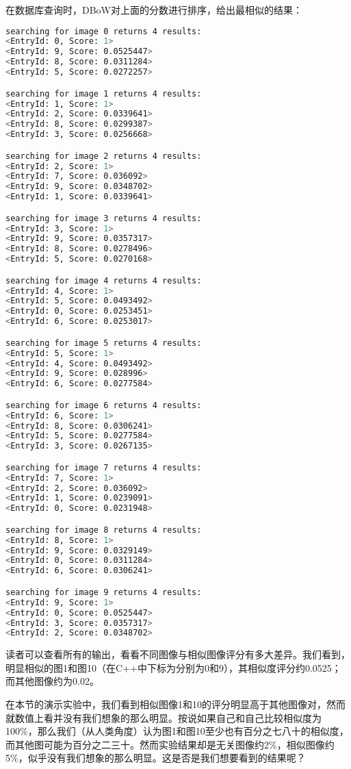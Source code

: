 在数据库查询时，DBoW对上面的分数进行排序，给出最相似的结果：
\begin{lstlisting}[language=sh,caption=终端输出：]
searching for image 0 returns 4 results:
<EntryId: 0, Score: 1>
<EntryId: 9, Score: 0.0525447>
<EntryId: 8, Score: 0.0311284>
<EntryId: 5, Score: 0.0272257>

searching for image 1 returns 4 results:
<EntryId: 1, Score: 1>
<EntryId: 2, Score: 0.0339641>
<EntryId: 8, Score: 0.0299387>
<EntryId: 3, Score: 0.0256668>

searching for image 2 returns 4 results:
<EntryId: 2, Score: 1>
<EntryId: 7, Score: 0.036092>
<EntryId: 9, Score: 0.0348702>
<EntryId: 1, Score: 0.0339641>

searching for image 3 returns 4 results:
<EntryId: 3, Score: 1>
<EntryId: 9, Score: 0.0357317>
<EntryId: 8, Score: 0.0278496>
<EntryId: 5, Score: 0.0270168>

searching for image 4 returns 4 results:
<EntryId: 4, Score: 1>
<EntryId: 5, Score: 0.0493492>
<EntryId: 0, Score: 0.0253451>
<EntryId: 6, Score: 0.0253017>

searching for image 5 returns 4 results:
<EntryId: 5, Score: 1>
<EntryId: 4, Score: 0.0493492>
<EntryId: 9, Score: 0.028996>
<EntryId: 6, Score: 0.0277584>

searching for image 6 returns 4 results:
<EntryId: 6, Score: 1>
<EntryId: 8, Score: 0.0306241>
<EntryId: 5, Score: 0.0277584>
<EntryId: 3, Score: 0.0267135>

searching for image 7 returns 4 results:
<EntryId: 7, Score: 1>
<EntryId: 2, Score: 0.036092>
<EntryId: 1, Score: 0.0239091>
<EntryId: 0, Score: 0.0231948>

searching for image 8 returns 4 results:
<EntryId: 8, Score: 1>
<EntryId: 9, Score: 0.0329149>
<EntryId: 0, Score: 0.0311284>
<EntryId: 6, Score: 0.0306241>

searching for image 9 returns 4 results:
<EntryId: 9, Score: 1>
<EntryId: 0, Score: 0.0525447>
<EntryId: 3, Score: 0.0357317>
<EntryId: 2, Score: 0.0348702>
\end{lstlisting}

读者可以查看所有的输出，看看不同图像与相似图像评分有多大差异。我们看到，明显相似的图1和图10（在C++中下标为分别为0和9），其相似度评分约0.0525；而其他图像约为0.02。

在本节的演示实验中，我们看到相似图像1和10的评分明显高于其他图像对，然而就数值上看并没有我们想象的那么明显。按说如果自己和自己比较相似度为100\%，那么我们（从人类角度）认为图1和图10至少也有百分之七八十的相似度，而其他图可能为百分之二三十。然而实验结果却是无关图像约2\%，相似图像约5\%，似乎没有我们想象的那么明显。这是否是我们想要看到的结果呢？

